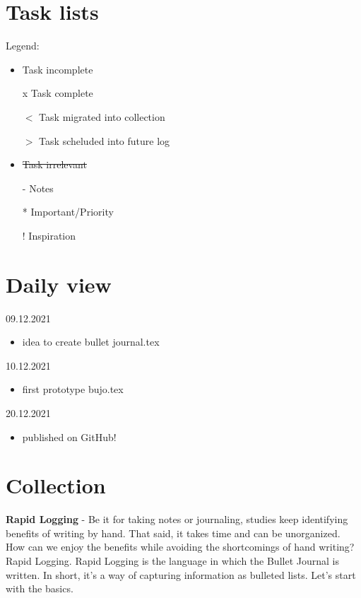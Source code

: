 \documentclass[a5paper,11pt]{article}
\begin{document}
	\section*{Task lists}
Legend:
	\begin{itemize}
		\item Task incomplete
		\item[x] Task complete 
		\item[$<$] Task migrated into collection
		\item[$>$] Task scheluded into future log
		\item \sout{Task irrelevant} %
		\item[-] Notes
		\item[*] Important/Priority
		\item[!] Inspiration
	\end{itemize}
  \newpage
	\section*{Daily view}
		09.12.2021
\begin{itemize}
	\item idea to create bullet journal.tex
\end{itemize}
		10.12.2021
\begin{itemize}
	\item first prototype bujo.tex
\end{itemize}
		20.12.2021
\begin{itemize}
	\item published on GitHub!
\end{itemize}
    \newpage
	\section*{Collection}
\textbf{Rapid Logging} - Be it for taking notes or journaling, studies keep identifying benefits of writing by hand. That said, it takes time and can be unorganized. How can we enjoy the benefits while avoiding the shortcomings of hand writing? Rapid Logging. Rapid Logging is the language in which the Bullet Journal is written. In short, it's a way of capturing information as bulleted lists. Let's start with the basics.
\end{document}
